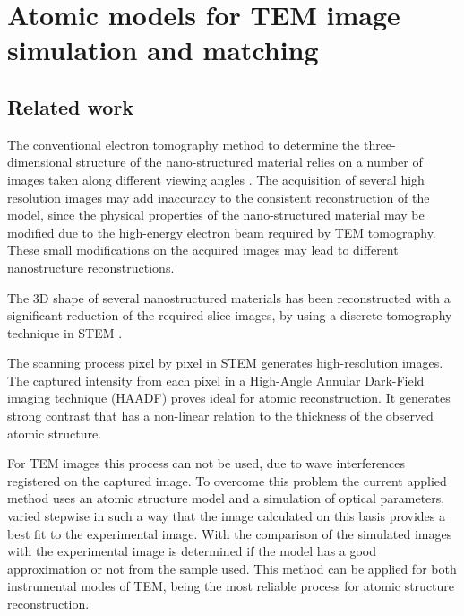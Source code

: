 \documentclass[
  oneside,
  11pt, a4paper,
  footinclude=true,
  headinclude=true,
  cleardoublepage=empty
]{scrbook}
\begin{document}
	\chapter{Atomic models for TEM image simulation and matching}

	\section{Related work}
	
	The conventional electron tomography method to determine the three-dimensional structure of the nano-structured material relies on a number of images taken along different viewing angles \citep{batenburg20093d}. 
The acquisition of several high resolution images may add inaccuracy to the consistent reconstruction of the model, since the physical properties of the nano-structured material 
may be modified due to the high-energy electron beam required by TEM tomography. These small modifications on the acquired images may lead to different nanostructure reconstructions.\par 

The 3D shape of several nanostructured materials has been reconstructed  with a significant reduction of the required slice images, by using a discrete tomography technique in
STEM \citep{jinschek20083}.
\par 

The scanning process pixel by pixel in STEM generates high-resolution images. The captured intensity from each pixel in a High-Angle Annular Dark-Field imaging technique (HAADF) proves ideal for atomic reconstruction\citep{jia2014determination}. It generates strong contrast that has a non-linear relation to the thickness of the observed atomic structure.\par 
For TEM images this process can not be used, due to wave interferences registered on the captured image. To overcome this problem the current applied method uses an atomic structure model 
and a simulation of optical parameters,
 varied stepwise in such a way that the image calculated
on this basis provides a best fit to the experimental image. 
 With the comparison of the simulated images with the experimental image is determined if the model has a good approximation or not from the sample used. 
 This method can be applied for both instrumental modes of TEM, being the most reliable process for atomic structure reconstruction.
	
\end{document}
